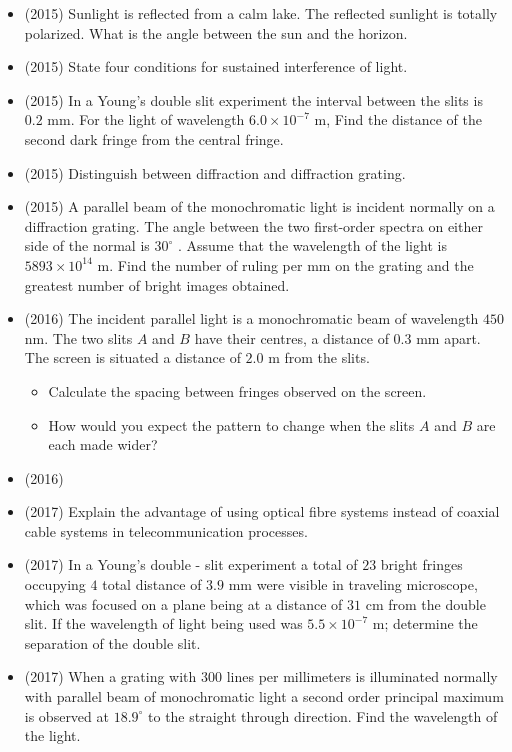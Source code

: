 \documentclass{article}
\begin{document}
\begin{itemize}
\item (2015)  Sunlight is reflected from a calm lake.  The reflected sunlight is totally polarized.  What is the angle between the sun and the horizon.
\item (2015)  State four conditions for sustained interference of light.
\item (2015)  In a Young’s double slit experiment the interval between the slits is $ 0.2$ mm.  For the light of wavelength $ 6.0\times 10^{-7}$ m, Find the distance of the second dark fringe from the central fringe.
\item (2015)  Distinguish between diffraction and diffraction grating.
\item (2015)  A parallel beam of the monochromatic light is incident normally on a diffraction grating.  The angle between the two first-order spectra on either side of the normal is $ 30^{\circ}$ .  Assume that the wavelength of the light is $ 5893\times 10^{14}$ m. Find the number of ruling per mm on the grating and the greatest number of bright images obtained. 
\item (2016)  The incident parallel light is a monochromatic beam of wavelength $ 450$ nm.  The two slits $ A$ and $ B$ have their centres, a distance of $ 0.3$ mm apart.  The screen is situated a distance of $ 2.0$ m from the slits.\begin{itemize}
\item Calculate the spacing between fringes observed on the screen.
\item How would you expect the pattern to change when the slits $ A$ and $ B$ are each made wider?
\end{itemize}
\item (2016)  \item (2017)  Explain the advantage of using optical fibre systems instead of coaxial cable systems in telecommunication processes.
\item (2017)  In a Young's double - slit experiment a total of $ 23$ bright fringes occupying $ 4$ total distance of $ 3.9$ mm were visible in traveling microscope, which was focused on a plane being at a distance of $ 31$ cm from the double slit. If the wavelength of light being used was $ 5.5 \times 10^{-7}$ m; determine the separation of the double slit.
\item (2017)  When a grating with $ 300$ lines per millimeters is illuminated normally with parallel beam of monochromatic light a second order principal maximum is observed at $ 18.9^{\circ}$ to the straight through direction. Find the wavelength of the light.

\end{itemize}
\end{document}
